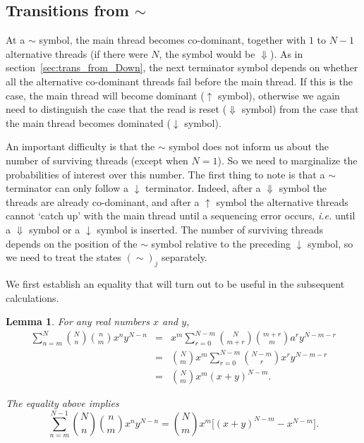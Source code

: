\documentclass{article}
\newtheorem{lemma}{Lemma}
\begin{document}
\subsection{Transitions from $\sim$}
\label{sec:trans_from_sim}

At a $\sim$ symbol, the main thread becomes co-dominant, together with $1$
to $N-1$ alternative threads (if there were $N$, the symbol would be
$\Downarrow$). As in section~\ref{sec:trans_from_Down}, the next
terminator symbol depends on whether all the alternative co-dominant
threads fail before the main thread. If this is the case, the main thread
will become dominant ($\uparrow$ symbol), otherwise we again need to
distinguish the case that the read is reset ($\Downarrow$ symbol) from the
case that the main thread becomes dominated ($\downarrow$ symbol).

An important difficulty is that the $\sim$ symbol does not inform us about
the number of surviving threads (except when $N = 1$). So we need to
marginalize the probabilities of interest over this number. The first
thing to note is that a $\sim$ terminator can only follow a $\downarrow$
terminator. Indeed, after a $\Downarrow$ symbol the threads are already
co-dominant, and after a $\uparrow$ symbol the alternative threads cannot
`catch up' with the main thread until a sequencing error occurs,
\textit{i.e.} until a $\Downarrow$ symbol or a $\downarrow$ symbol is
inserted. The number of surviving threads depends on the position of the
$\sim$ symbol relative to the preceding $\downarrow$ symbol, so we need
to treat the states $(\sim)_j$ separately.

We first establish an equality that will turn out to be useful in the
subsequent calculations.

\begin{lemma}
For any real numbers $x$ and $y$,
\begin{eqnarray*}
\sum_{n=m}^N {N \choose n} {n \choose m} x^n y^{N-n}
&=& x^m \sum_{r=0}^{N-m} {N \choose m+r} {m+r \choose m}a^r y^{N-m-r} \\
&=& {N \choose m} x^m \sum_{r=0}^{N-m} {N-m \choose r}x^r y^{N-m-r} \\
&=& {N \choose m} x^m (x+y)^{N-m}.
\end{eqnarray*}

The equality above implies
\begin{equation}
\label{eq:double_binom}
\sum_{n=m}^{N-1} {N \choose n} {n \choose m} x^n y^{N-n} =
{N \choose m} x^m \Big[ (x+y)^{N-m} - x^{N-m} \Big].
\end{equation}
\end{lemma}
\end{document}
